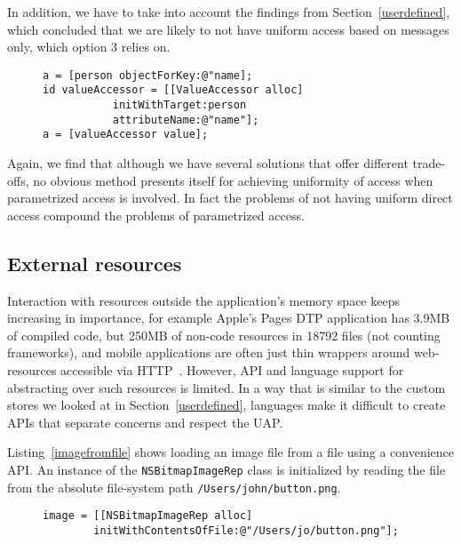 \documentclass[preprint]{sigplanconf}
\begin{document}
In addition, we have to take into account the findings from
Section~\ref{userdefined}, which concluded that we are likely to not have uniform access based on
messages only, which option 3 relies on.  

\begin{figure}[htbp]
\begin{lstlisting}[style=numbers,label=valueacessoruse,caption=Keyed access vs. using a ValueAccessor]
a = [person objectForKey:@"name];
id valueAccessor = [[ValueAccessor alloc]
           initWithTarget:person 
           attributeName:@"name"];
a = [valueAccessor value];
\end{lstlisting}
\end{figure}

Again, we find that although we have several solutions that offer different trade-offs, no obvious
method presents itself for achieving uniformity of access when parametrized access is involved.
In fact the problems of not having uniform direct access compound the problems of parametrized access.


\subsection{External resources}

Interaction with resources outside the application's memory space keeps increasing
in importance,
for example Apple's Pages DTP application has 3.9MB of compiled code,
but 250MB of non-code resources in 18792 files (not counting frameworks), and
mobile applications are often just thin wrappers around web-resources accessible
via HTTP~\cite{http}.  However, API and language support
for abstracting over such resources is limited.  In a way that is similar to the custom stores we looked at in Section~\ref{userdefined}, languages make it difficult to create APIs that separate concerns
and respect the UAP.

Listing~\ref{imagefromfile} shows loading an image file from a file using a convenience
API.   An instance of the {\tt NSBitmapImageRep} class is initialized by reading the file
from the absolute file-system path {\tt /Users/john/button.png}.

\begin{figure}[htbp]
\begin{lstlisting}[style=numbers,label=imagefromfile,caption=Accessing an image from the file system]
image = [[NSBitmapImageRep alloc] 
        initWithContentsOfFile:@"/Users/jo/button.png"];
\end{lstlisting}
\end{figure}
\end{document}

